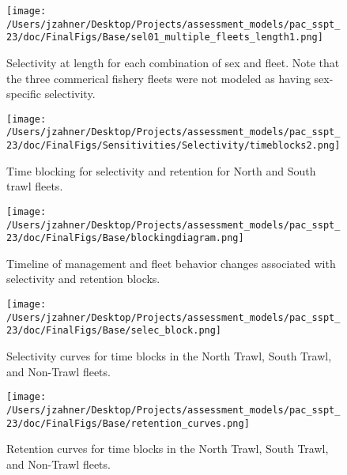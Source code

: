 \documentclass[11pt,
  letterpaper,
]{article}
\begin{document}
\begin{figure}
{\centering
\texttt{[image: /Users/jzahner/Desktop/Projects/assessment\_models/pac\_sspt\_23/doc/FinalFigs/Base/sel01\_multiple\_fleets\_length1.png]}
}
\caption{Selectivity at length for each combination of sex and fleet. Note that the three commerical fishery fleets were not modeled as having sex-specific selectivity.\label{fig:selcurvs}}
\end{figure}

\begin{figure}
{\centering
\texttt{[image: /Users/jzahner/Desktop/Projects/assessment\_models/pac\_sspt\_23/doc/FinalFigs/Sensitivities/Selectivity/timeblocks2.png]}
}
\caption{Time blocking for selectivity and retention for North and South trawl fleets.\label{fig:timeblocks}}
\end{figure}

\begin{figure}
{\centering
\texttt{[image: /Users/jzahner/Desktop/Projects/assessment\_models/pac\_sspt\_23/doc/FinalFigs/Base/blockingdiagram.png]}
}
\caption{Timeline of management and fleet behavior changes associated with selectivity and retention blocks.\label{fig:diagram}}
\end{figure}

\begin{figure}
{\centering
\texttt{[image: /Users/jzahner/Desktop/Projects/assessment\_models/pac\_sspt\_23/doc/FinalFigs/Base/selec\_block.png]}
}
\caption{Selectivity curves for time blocks in the North Trawl, South Trawl, and Non-Trawl fleets.\label{fig:selblocks}}
\end{figure}

\begin{figure}
{\centering
\texttt{[image: /Users/jzahner/Desktop/Projects/assessment\_models/pac\_sspt\_23/doc/FinalFigs/Base/retention\_curves.png]}
}
\caption{Retention curves for time blocks in the North Trawl, South Trawl, and Non-Trawl fleets.\label{fig:retblocks}}
\end{figure}
\end{document}

